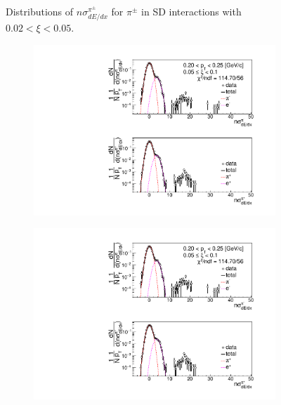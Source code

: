 \begin{figure}[h!]
\begin{subfigure}{.3\textwidth}
	\end{subfigure}
	\caption[Distributions of $n\sigma^{\pi^\pm}_{dE/dx}$ for $\pi^\pm$ in SD interactions with $0.02 < \xi<0.05$]{Distributions of $n\sigma^{\pi^\pm}_{dE/dx}$ for $\pi^\pm$ in SD interactions with $0.02 < \xi<0.05$.}
	\label{fig:nsigmapifit_0}
\end{figure}

\begin{figure}[h!]
	\centering
	\begin{subfigure}{.33\textwidth}
		\includegraphics[width=\linewidth, page=1]{chapters/chrgSTAR/img/dEdx/fit2019_secondStep_0_1.pdf}
	\end{subfigure}
	\begin{subfigure}{.33\textwidth}
		\includegraphics[width=\linewidth, page=2]{chapters/chrgSTAR/img/dEdx/fit2019_secondStep_0_1.pdf}

\end{subfigure}
\end{figure}
